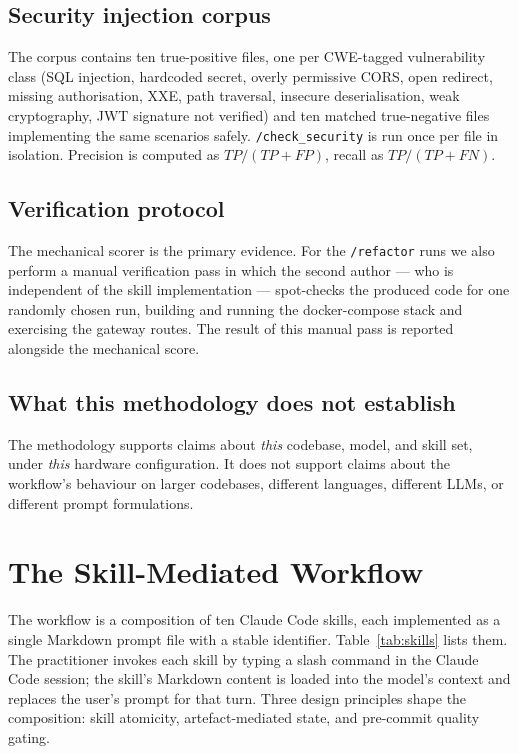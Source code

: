 \documentclass[journal]{IEEEtran}
\begin{document}
\subsection{Security injection corpus}
\label{sec:method-security}
The corpus contains ten true-positive files, one per CWE-tagged
vulnerability class (SQL injection, hardcoded secret, overly permissive
CORS, open redirect, missing authorisation, XXE, path traversal,
insecure deserialisation, weak cryptography, JWT signature not
verified) and ten matched true-negative files implementing the same
scenarios safely. \texttt{/check\_security} is run once per file in
isolation. Precision is computed as $\mathit{TP}/(\mathit{TP+FP})$,
recall as $\mathit{TP}/(\mathit{TP+FN})$.

\subsection{Verification protocol}
The mechanical scorer is the primary evidence. For the
\texttt{/refactor} runs we also perform a manual verification pass
in which the second author --- who is independent of the skill
implementation --- spot-checks the produced code for one randomly
chosen run, building and running the docker-compose stack and
exercising the gateway routes. The result of this manual pass is
reported alongside the mechanical score.

\subsection{What this methodology does not establish}
The methodology supports claims about \textit{this} codebase, model,
and skill set, under \textit{this} hardware configuration. It does
not support claims about the workflow's behaviour on larger codebases,
different languages, different LLMs, or different prompt formulations.

\section{The Skill-Mediated Workflow}
\label{sec:workflow}

The workflow is a composition of ten Claude Code skills, each
implemented as a single Markdown prompt file with a stable
identifier. Table~\ref{tab:skills} lists them. The practitioner
invokes each skill by typing a slash command in the Claude Code
session; the skill's Markdown content is loaded into the model's
context and replaces the user's prompt for that turn. Three design
principles shape the composition: skill atomicity, artefact-mediated
state, and pre-commit quality gating.
\end{document}
